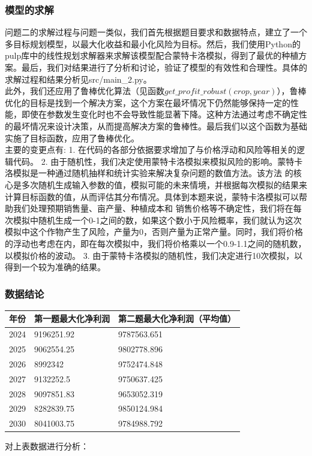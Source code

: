 \documentclass{cumcmthesis}
\begin{document}
\subsubsection{模型的求解}
问题二的求解过程与问题一类似，我们首先根据题目要求和数据特点，建立了一个多目标规划模型，以最大化收益和最小化风险为目标。然后，我们使用Python的pulp库中的线性规划求解器来求解该模型配合蒙特卡洛模拟，得到了最优的种植方案。最后，我们对结果进行了分析和讨论，验证了模型的有效性和合理性。具体的求解过程和结果分析见src/main\_2.py。\\

此外，我们还应用了鲁棒优化算法（见函数$ get\_profit\_robust(crop, year) $），鲁棒优化的目标是找到一个解决方案，这个方案在最坏情况下仍然能够保持一定的性能，即使在参数发生变化时也不会导致性能显著下降。这种方法通过考虑不确定性的最坏情况来设计决策，从而提高解决方案的鲁棒性。最后我们以这个函数为基础实施了目标函数，应用了鲁棒优化。\\

主要的变更点有:
1. 在代码的各部分依据要求增加了与价格浮动和风险等相关的逻辑代码。
2. 由于随机性，我们决定使用蒙特卡洛模拟来模拟风险的影响。蒙特卡洛模拟是一种通过随机抽样和统计实验来解决复杂问题的数值方法。该方法 的核心是多次随机生成输入参数的值，模拟可能的未来情境，并根据每次模拟的结果来 计算目标函数的值，从而评估其分布情况。具体到本题来说，蒙特卡洛模拟可以帮助我们处理预期销售量、亩产量、种植成本和 销售价格等不确定性，我们将在每次模拟中随机生成一个0-1之间的数，如果这个数小于风险概率，我们就认为这次模拟中这个作物产生了风险，产量为0，否则产量为正常产量。同时，我们将价格的浮动也考虑在内，即在每次模拟中，我们将价格乘以一个0.9-1.1之间的随机数，以模拟价格的波动。
3. 由于蒙特卡洛模拟的随机性，我们决定进行10次模拟，以得到一个较为准确的结果。

\subsubsection{数据结论}
\begin{table}[H]
    \centering
    \begin{tabular}{|l|l|l|}
    \hline
    \textbf{年份} & \textbf{第一题最大化净利润} & \textbf{第二题最大化净利润（平均值）}  \\ \hline
        2024 & 9196251.92 & 9787563.651
        \\ \hline
        2025 & 9062554.25 & 9802778.896
        \\ \hline
        2026 & 8992342 & 9752474.848
        \\ \hline
        2027 & 9132252.5 & 9750637.425
        \\ \hline
        2028 & 9097851.83 & 9653052.319
        \\ \hline
        2029 & 8282839.75 & 9850124.984
        \\ \hline
        2030 & 8041003.75 & 9784988.792
        \\ \hline

    \end{tabular}
\end{table}
对上表数据进行分析：
\end{document}
